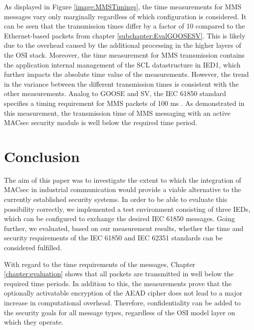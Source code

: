\documentclass[conference, onecolumn, a4paper]{IEEEtran}
\begin{document}
\noindent As displayed in Figure \ref{image:MMSTimings}, the time measurements for MMS messages vary only marginally regardless of which configuration 
is considered. It can be seen that the transmission times differ by a factor of 10 compared to the Ethernet-based packets from chapter \ref{subchapter:EvalGOOSESV}.
This is likely due to the overhead caused by the additional processing in the higher layers of the OSI stack. Moreover, the time measurement for MMS 
transmission contains the application internal management of the SCL datastructure in IED1, which further impacts the absolute time value of the 
measurements. However, the trend in the variance between the different transmission times is consistent with the other measurements. Analog to GOOSE 
and SV, the IEC 61850 standard specifies a timing requirement for MMS packets of 100 ms \cite{fixedLatencyGOOSESV:2021}. As demonstrated in this 
measurement, the transmission time of MMS messaging with an active MACsec security module is well below the required time period. 

\section{Conclusion}
\label{chapter:conclusion}
\noindent The aim of this paper was to investigate the extent to which the integration of MACsec in industrial communication would provide a viable 
alternative to the currently established security systems. In order to be able to evaluate this possibility correctly, we implemented a test environment  
consisting of three IEDs, which can be configured to exchange the desired IEC 61850 messages. Going further, we evaluated, based on 
our measurement results, whether the time and security requirements of the IEC 61850 and IEC 62351 standards can be considered fulfilled.  

\smallskip
With regard to the time requirements of the messages, Chapter \ref{chapter:evaluation} shows that all packets are transmitted in well below the required 
time periods. In addition to this, the measurements prove that the optionally activatable encryption of the AEAD cipher does not lead to a major increase 
in computational overhead. Therefore, confidentiality can be added to the security goals for all message types, regardless of the OSI model layer on which 
they operate. 
\end{document}
